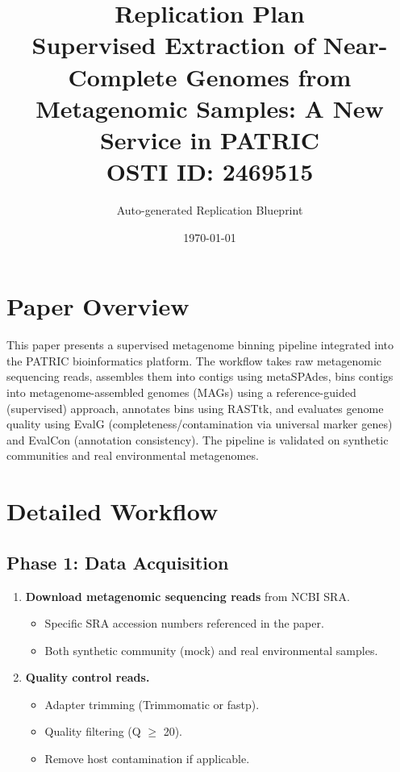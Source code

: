\documentclass[11pt,a4paper]{article}
\title{\textbf{Replication Plan}\\[0.5em]
\large Supervised Extraction of Near-Complete Genomes from Metagenomic Samples: A New Service in PATRIC\\[0.3em]
\normalsize OSTI ID: 2469515}
\author{Auto-generated Replication Blueprint}
\date{\today}
\begin{document}
\maketitle
\tableofcontents
\newpage

\section{Paper Overview}
This paper presents a supervised metagenome binning pipeline integrated into the PATRIC bioinformatics platform. The workflow takes raw metagenomic sequencing reads, assembles them into contigs using metaSPAdes, bins contigs into metagenome-assembled genomes (MAGs) using a reference-guided (supervised) approach, annotates bins using RASTtk, and evaluates genome quality using EvalG (completeness/contamination via universal marker genes) and EvalCon (annotation consistency). The pipeline is validated on synthetic communities and real environmental metagenomes.

\section{Detailed Workflow}

\subsection{Phase 1: Data Acquisition}
\begin{enumerate}[label=\textbf{1.\arabic*}]
  \item \textbf{Download metagenomic sequencing reads} from NCBI SRA.
    \begin{itemize}
      \item Specific SRA accession numbers referenced in the paper.
      \item Both synthetic community (mock) and real environmental samples.
    \end{itemize}
  \item \textbf{Quality control reads.}
    \begin{itemize}
      \item Adapter trimming (Trimmomatic or fastp).
      \item Quality filtering (Q $\geq$ 20).
      \item Remove host contamination if applicable.
    \end{itemize}
\end{enumerate}
\end{document}
